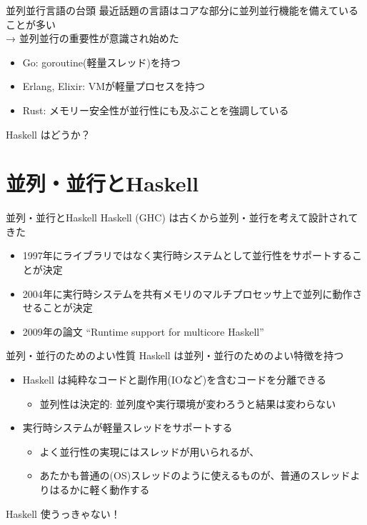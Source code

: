 \documentclass[unicode,12pt]{beamer}
\begin{document}
\begin{frame}{並列並行言語の台頭}
  最近話題の言語はコアな部分に並列並行機能を備えていることが多い \\
  → 並列並行の重要性が意識され始めた
  \begin{itemize}
  \item Go: goroutine(軽量スレッド)を持つ
  \item Erlang, Elixir: VMが軽量プロセスを持つ
  \item Rust: メモリー安全性が並行性にも及ぶことを強調している
  \end{itemize}
  Haskell はどうか？
\end{frame}

\section{並列・並行とHaskell}

\begin{frame}{並列・並行とHaskell}
  Haskell (GHC) は古くから並列・並行を考えて設計されてきた
  \begin{itemize}
  \item 1997年にライブラリではなく実行時システムとして並行性をサポートすることが決定
  \item 2004年に実行時システムを共有メモリのマルチプロセッサ上で並列に動作させることが決定
  \item 2009年の論文 ``Runtime support for multicore Haskell''
  \end{itemize}
\end{frame}

\begin{frame}{並列・並行のためのよい性質}
  Haskell は並列・並行のためのよい特徴を持つ
  \begin{itemize}
  \item Haskell は純粋なコードと副作用(IOなど)を含むコードを分離できる
    \begin{itemize}
    \item 並列性は\alert{決定的}: 並列度や実行環境が変わろうと結果は変わらない
    \end{itemize}
  \item 実行時システムが\alert{軽量スレッド}をサポートする
    \begin{itemize}
    \item よく並行性の実現にはスレッドが用いられるが、
    \item あたかも普通の(OS)スレッドのように使えるものが、普通のスレッドよりはるかに軽く動作する
    \end{itemize}
  \end{itemize}
  Haskell 使うっきゃない！
\end{frame}
\end{document}
